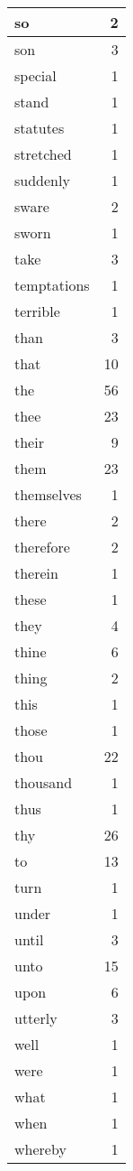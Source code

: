 \begin{center}
\begin{longtable}{l|r}
so & 2 \\ \hline
son & 3 \\ \hline
special & 1 \\ \hline
stand & 1 \\ \hline
statutes & 1 \\ \hline
stretched & 1 \\ \hline
suddenly & 1 \\ \hline
sware & 2 \\ \hline
sworn & 1 \\ \hline
take & 3 \\ \hline
temptations & 1 \\ \hline
terrible & 1 \\ \hline
than & 3 \\ \hline
that & 10 \\ \hline
the & 56 \\ \hline
thee & 23 \\ \hline
their & 9 \\ \hline
them & 23 \\ \hline
themselves & 1 \\ \hline
there & 2 \\ \hline
therefore & 2 \\ \hline
therein & 1 \\ \hline
these & 1 \\ \hline
they & 4 \\ \hline
thine & 6 \\ \hline
thing & 2 \\ \hline
this & 1 \\ \hline
those & 1 \\ \hline
thou & 22 \\ \hline
thousand & 1 \\ \hline
thus & 1 \\ \hline
thy & 26 \\ \hline
to & 13 \\ \hline
turn & 1 \\ \hline
under & 1 \\ \hline
until & 3 \\ \hline
unto & 15 \\ \hline
upon & 6 \\ \hline
utterly & 3 \\ \hline
well & 1 \\ \hline
were & 1 \\ \hline
what & 1 \\ \hline
when & 1 \\ \hline
whereby & 1 \\ \hline

\end{longtable}
\end{center}
